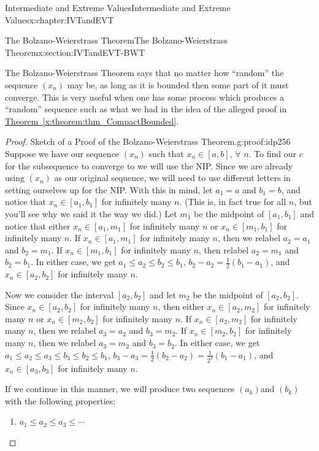 \begin{chapterptx}{Intermediate and Extreme Values}{}{Intermediate and Extreme Values}{}{}{x:chapter:IVTandEVT}
\begin{sectionptx}{The Bolzano-Weierstrass Theorem}{}{The Bolzano-Weierstrass Theorem}{}{}{x:section:IVTandEVT-BWT}
		\par
		The Bolzano-Weierstrass Theorem says that no matter how ``random'' the sequence \(\left(x_n\right)\) may be, as long as it is bounded then some part of it must converge. This is very useful when one has some process which produces a ``random'' sequence such as what we had in the idea of the alleged proof in \hyperref[x:theorem:thm_CompactBounded]{Theorem~{\xreffont\ref{x:theorem:thm_CompactBounded}}}.%
		\begin{proof}{Sketch of a Proof of the Bolzano-Weierstrass Theorem.}{g:proof:idp256}
			Suppose we have our sequence \(\left(x_n\right)\) such that \(x_n\in[a,b]\), \(\forall\) \(n\). To find our \(c\) for the subsequence to converge to we will use the NIP. Since we are already using \(\left(x_n\right)\) as our original sequence, we will need to use different letters in setting ourselves up for the NIP. With this in mind, let \(a_1=a\) and \(b_1=b\), and notice that \(x_n\in[a_1,b_1]\) for infinitely many \(n\). (This is, in fact true for all \(n\), but you'll see why we said it the way we did.) Let \(m_1\) be the midpoint of \([a_1,b_1]\) and notice that either \(x_n\in[a_1,m_1]\) for infinitely many \(n\) or \(x_n\in[m_1,b_1]\) for infinitely many \(n\). If \(x_n\in[a_1,m_1]\) for infinitely many \(n\), then we relabel \(a_2=a_1\) and \(b_2=m_1\). If \(x_n\in[m_1,b_1]\) for infinitely many \(n\), then relabel \(a_2=m_1\) and \(b_2=b_1\). In either case, we get \(a_1\leq a_2\leq b_2\leq b_1\), \(b_2-a_2=\frac{1}{2}\left(b_1-a_1\right)\), and \(x_n\in[a_2,b_2]\) for infinitely many \(n\).%
			\par
			Now we consider the interval \([a_2,b_2]\) and let \(m_2\) be the midpoint of \([a_2,b_2]\). Since \(x_n\in[a_2,b_2]\) for infinitely many \(n\), then either \(x_n\in[a_2,m_2]\) for infinitely many \(n\) or \(x_n\in[m_2,b_2]\) for infinitely many \(n\). If \(x_n\in[a_2,m_2]\) for infinitely many \(n\), then we relabel \(a_3=a_2\) and \(b_3=m_2\). If \(x_n\in[m_2,b_2]\) for infinitely many \(n\), then we relabel \(a_3=m_2\) and \(b_3=b_2\). In either case, we get \(a_1\leq a_2\leq a_3\leq b_3\leq b_2\leq b_1\), \(b_3-a_3=\frac{1}{2}\left(b_2-a_2\right)=\frac{1}{2^2}\left(b_1-a_1\right)\), and \(x_n\in[a_3,b_3]\) for infinitely many \(n\).%
			\par
			If we continue in this manner, we will produce two sequences \(\left(a_k\right)\)and \(\left(b_k\right)\) with the following properties:%
			\begin{enumerate}
				\item{}\(\displaystyle a_1\leq a_2\leq a_3\leq\cdots\)%

\end{enumerate}
\end{proof}
\end{sectionptx}
\end{chapterptx}
